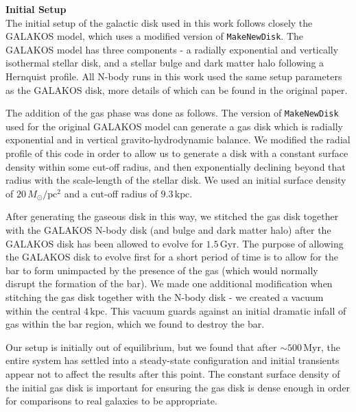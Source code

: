 \documentclass{natureprintstyle}
\begin{document}
\noindent
{\bf Initial Setup}
\\
\noindent
The initial setup of the galactic disk used in this work follows closely the
GALAKOS model\cite{2020ApJ...890..117D}, which uses a modified version of
\texttt{MakeNewDisk}.\cite{2005MNRAS.361..776S} The GALAKOS model has three
components - a radially exponential and vertically isothermal stellar disk,
and a stellar bulge and dark matter halo following a Hernquist
profile.\cite{1990ApJ...356..359H} All N-body runs in this work used the same
setup parameters as the GALAKOS disk, more details of which can be found in
the original paper.

The addition of the gas phase was done as follows. The version of
\texttt{MakeNewDisk} used for the original GALAKOS model can generate a gas
disk which is radially exponential and in vertical gravito-hydrodynamic
balance. We modified the radial profile of this code in order to allow us to
generate a disk with a constant surface density within some cut-off radius,
and then exponentially declining beyond that radius with the scale-length of
the stellar disk. We used an initial surface density of
$20\,M_{\odot}/\textrm{pc}^2$ and a cut-off radius of $9.3\,\textrm{kpc}$.

After generating the gaseous disk in this way, we stitched the gas disk
together with the GALAKOS N-body disk (and bulge and dark matter halo) after
the GALAKOS disk has been allowed to evolve for $1.5\,\textrm{Gyr}$. The
purpose of allowing the GALAKOS disk to evolve first for a short period of
time is to allow for the bar to form unimpacted by the presence of the gas
(which would normally disrupt the formation of the bar). We made one
additional modification when stitching the gas disk together with the N-body
disk - we created a vacuum within the central $4\,\textrm{kpc}$. This vacuum
guards against an initial dramatic infall of gas within the bar region, which
we found to destroy the bar.

Our setup is initially out of equilibrium, but we found that after
$\sim500\,\textrm{Myr}$, the entire system has settled into a steady-state
configuration and initial transients appear not to affect the results after
this point. The constant surface density of the initial gas disk is important
for ensuring the gas disk is dense enough in order for comparisons to real
galaxies to be appropriate.
\end{document}
